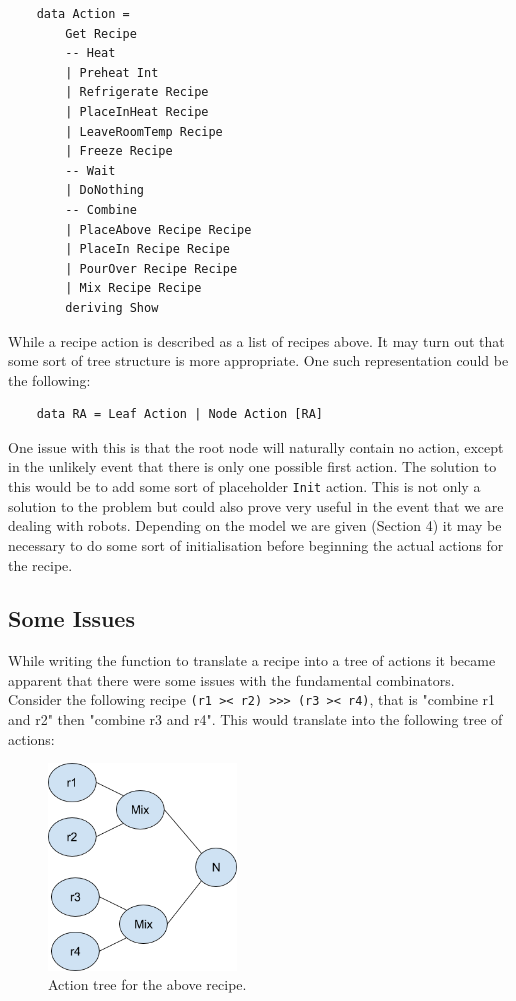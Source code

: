 \documentclass[11pt]{article}
\begin{document}
    \begin{tt}
    \small
    \begin{lstlisting}
    data Action =
        Get Recipe
        -- Heat
        | Preheat Int
        | Refrigerate Recipe
        | PlaceInHeat Recipe
        | LeaveRoomTemp Recipe
        | Freeze Recipe
        -- Wait
        | DoNothing
        -- Combine
        | PlaceAbove Recipe Recipe
        | PlaceIn Recipe Recipe
        | PourOver Recipe Recipe
        | Mix Recipe Recipe
        deriving Show
    \end{lstlisting}
    \end{tt}

    While a recipe action is described as a list of recipes above. It may turn out that some
    sort of tree structure is more appropriate. One such representation could be the following:

    \begin{tt}
    \small
    \begin{lstlisting}
    data RA = Leaf Action | Node Action [RA]
    \end{lstlisting}
    \end{tt}

    One issue with this is that the root node will naturally contain no action, except in the
    unlikely event that there is only one possible first action. The solution to this would
    be to add some sort of placeholder \texttt{Init} action. This is not only a solution to
    the problem but could also prove very useful in the event that we are dealing with
    robots. Depending on the model we are given (Section 4) it may be necessary to do
    some sort of initialisation before beginning the actual actions for the recipe.

    \subsection{Some Issues}

    While writing the function to translate a recipe into a tree of actions it became apparent
    that there were some issues with the fundamental combinators. Consider the following
    recipe \texttt{(r1 >< r2) >>> (r3 >< r4)}, that is "combine r1 and r2" then "combine r3 and r4".
    This would translate into the following tree of actions:

    \begin{figure}[ht]
        \centering
            \includegraphics[width=5cm,keepaspectratio]{issue1.png}
        \caption{Action tree for the above recipe.}
    \end{figure}
\end{document}
